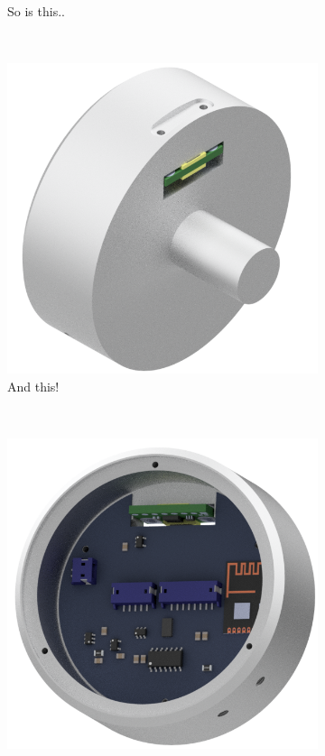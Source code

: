 \begin{figure}[H]
\begin{minipage}{.4\linewidth}
\begin{subfigure}[t]{\linewidth}
			\caption{So is this..}
			\label{sfig:magnetside}
		\end{subfigure}\\
		\begin{subfigure}[b]{\linewidth}
			\centering
			\includegraphics[width=\linewidth]{graphics/joint_read_side}
			\caption{And this!}
			\label{sfig:readside}
		\end{subfigure}\\
		\begin{subfigure}[b]{\linewidth}
			\centering
			\includegraphics[width=\linewidth]{graphics/joint_read_side_2}

\end{subfigure}
\end{minipage}
\end{figure}

